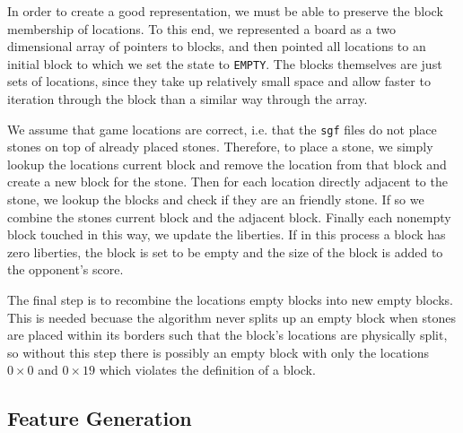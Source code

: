 \documentclass[11pt,letterpaper]{article}
\begin{document}
In order to create a good representation, we must be able to preserve the block membership of locations. To this
end, we represented a board as a two dimensional array of pointers to blocks, and then pointed all locations to
an initial block to which we set the state to {\tt EMPTY}. The blocks themselves are just sets of locations, since
they take up relatively small space and allow faster to iteration through the block than a similar way through the
array.

We assume that game locations are correct, i.e. that the {\tt sgf} files do not place stones on top of already placed
stones. Therefore, to place a stone, we simply lookup the locations current block and remove the location from
that block and create a new block for the stone. Then for each location directly adjacent to the stone, we lookup the
blocks and check if they are an friendly stone. If so we combine the stones current block and the adjacent block.
Finally each nonempty block touched in this way, we update the liberties. If in this process a block has zero liberties,
the block is set to be empty and the size of the block is added to the opponent's score.

The final step is to recombine the locations empty blocks into new empty blocks. This is needed becuase the
algorithm never splits up an empty block when stones are placed within its borders such that the block's locations
are physically split, so without this step there is possibly an empty block with only the locations $0 \times 0$ and
$0 \times 19$ which violates the definition of a block.

\subsection{Feature Generation}
\end{document}

